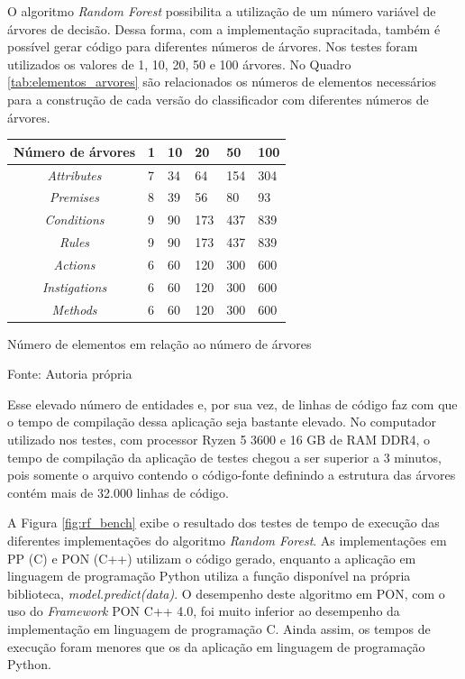 O algoritmo \textit{Random Forest} possibilita a utilização de um número
variável de árvores de decisão. Dessa forma, com a implementação supracitada,
também é possível gerar código para diferentes números de árvores. Nos testes
foram utilizados os valores de 1, 10, 20, 50 e 100 árvores. No Quadro
\ref{tab:elementos_arvores} são relacionados os números de elementos necessários
para a construção de cada versão do classificador com diferentes números de
árvores.

\begin{tabframed}[!htb]
\centering
\label{tab:elementos_arvores}
\smallskip
\begin{tabularx}{0.8\textwidth}{|c|X|X|X|X|X|}
\hline
\textbf{Número de árvores} & 1 & 10 & 20 & 50 & 100\\
\hline
\hline
\textit{Attributes} & 7 & 34 & 64 & 154 & 304 \\
\hline
\textit{Premises} & 8 & 39 & 56 & 80 & 93 \\
\hline
\textit{Conditions} & 9 & 90 & 173 & 437 & 839 \\
\hline
\textit{Rules} & 9 & 90 & 173 & 437 & 839 \\
\hline
\textit{Actions} & 6 & 60 & 120 & 300 & 600 \\
\hline
\textit{Instigations} & 6 & 60 & 120 & 300 & 600 \\
\hline
\textit{Methods} & 6 & 60 & 120 & 300 & 600 \\
\hline
\end{tabularx}
\caption{Número de elementos em relação ao número de árvores}
\caption*{Fonte: Autoria própria}
\end{tabframed}

Esse elevado número de entidades e, por sua vez, de linhas de código faz com que
o tempo de compilação dessa aplicação seja bastante elevado. No computador
utilizado nos testes, com processor Ryzen 5 3600 e 16 GB de RAM DDR4, o tempo de
compilação da aplicação de testes chegou a ser superior a 3 minutos, pois
somente o arquivo contendo o código-fonte definindo a estrutura das árvores
contém mais de 32.000 linhas de código.

A Figura \ref{fig:rf_bench} exibe o resultado dos testes de tempo de execução
das diferentes implementações do algoritmo \textit{Random Forest}. As
implementações em PP (C) e PON (C++) utilizam o código gerado, enquanto a
aplicação em linguagem de programação Python utiliza a função disponível na
própria biblioteca, \textit{model.predict(data)}. O desempenho deste algoritmo
em PON, com o uso do \textit{Framework} PON C++ 4.0, foi muito inferior ao
desempenho da implementação em linguagem de programação C. Ainda assim, os
tempos de execução foram menores que os da aplicação em linguagem de programação
Python.

